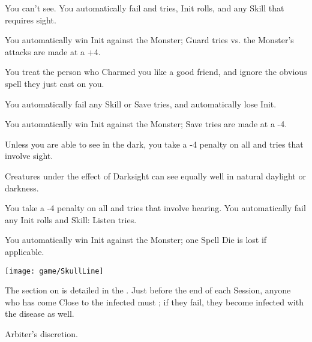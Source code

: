 \begin{multicols*}{2}

  You can't see. You automatically fail \RO and \RB tries, Init rolls, and any Skill that requires sight.

    You automatically win Init against the Monster; Guard tries vs. the Monster's attacks are made at a +4.


  You treat the person who Charmed you like a good friend, and ignore the obvious spell they just cast on you.


  You automatically fail any Skill or Save tries, and automatically lose Init.

   You automatically win Init against the Monster;  Save tries are made at a -4.


  Unless you are able to see in the dark, you take a -4 penalty on all \RO and \RB tries that involve sight.


  Creatures under the effect of Darksight can see equally well in natural daylight or darkness.


  You take a -4 penalty on all \RO and \RB tries that involve hearing.  You automatically fail any Init rolls and Skill: Listen tries.

    You automatically win Init against the Monster; one Spell Die is lost if applicable.

    \begin{center}
    \texttt{[image: game/SkullLine]}
    \end{center}

\cbreak


  The section on  is detailed in the . Just before the end of each Session, anyone who has come Close to the infected must \RSTRY{\VIG}; if they fail, they become infected with the disease as well.

  Arbiter's discretion.


\end{multicols*}
